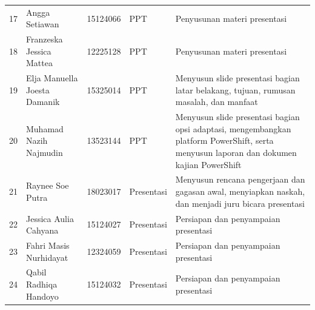 \begin{longtable}{p{} p{} p{} p{} p{}}
17 & Angga Setiawan & 15124066 & PPT & Penyusunan materi presentasi \\
18 & Franzeska Jessica Mattea & 12225128 & PPT & Penyusunan materi presentasi \\
19 & Elja Manuella Joesta Damanik & 15325014 & PPT & Menyusun slide presentasi bagian latar belakang, tujuan, rumusan masalah, dan manfaat \\
20 & Muhamad Nazih Najmudin & 13523144 & PPT & Menyusun slide presentasi bagian opsi adaptasi, mengembangkan platform PowerShift, serta menyusun laporan dan dokumen kajian PowerShift \\
21 & Raynee Soe Putra & 18023017 & Presentasi & Menyusun rencana pengerjaan dan gagasan awal, menyiapkan naskah, dan menjadi juru bicara presentasi \\
22 & Jessica Aulia Cahyana & 15124027 & Presentasi & Persiapan dan penyampaian presentasi \\
23 & Fahri Masis Nurhidayat & 12324059 & Presentasi & Persiapan dan penyampaian presentasi \\
24 & Qabil Radhiqa Handoyo & 15124032 & Presentasi & Persiapan dan penyampaian presentasi \\
\bottomrule
\end{longtable}
